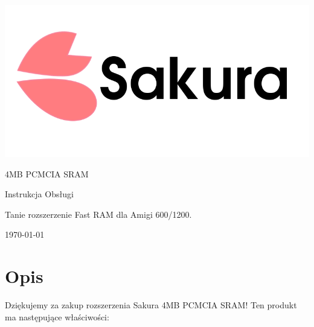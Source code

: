 \documentclass[10pt,a4paper]{article}
\begin{document}
\begin{titlepage}
\begin{center}

\includegraphics[scale=0.25]{../../common/sakuralogo.png}
\vfill

\huge
4MB PCMCIA SRAM

Instrukcja Obsługi

\vspace*{1cm}

\normalsize
Tanie rozszerzenie Fast RAM dla Amigi 600/1200.

\vspace*{5cm}

\today

\end{center}
\end{titlepage}

\section*{Opis}

Dziękujemy za zakup rozszerzenia Sakura 4MB PCMCIA SRAM! Ten produkt ma następujące właściwości:
\end{document}
